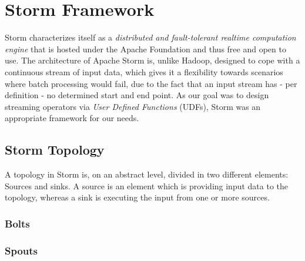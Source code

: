 \section{Storm Framework}
\label{sect:architecture}

	Storm characterizes itself as a \textit{distributed and fault-tolerant realtime computation engine} that is hosted under the Apache Foundation and thus free and open to use.
	The architecture of Apache Storm is, unlike Hadoop, designed to cope with a continuous stream of input data, which gives it a flexibility towards scenarios where batch processing would fail, due to the fact that an input stream has - per definition - no determined start and end point. As our goal was to design streaming operators via \textit{User Defined Functions} (UDFs), Storm was an appropriate framework for our needs.


\subsection{Storm Topology}
\label{sect:stormTopology}
	A topology in Storm is, on an abstract level, divided in two different elements: Sources and sinks. A source is an element which is providing input data to the topology, whereas a
	sink is executing the input from one or more sources.

\subsubsection{Bolts}

\subsubsection{Spouts}